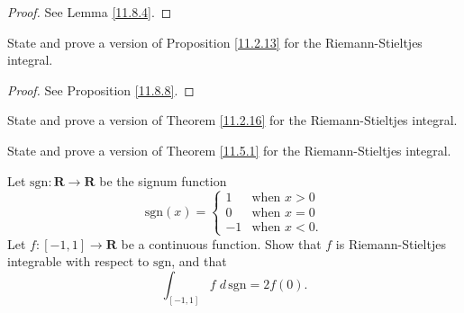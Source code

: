 \begin{proof}
    See Lemma \ref{11.8.4}.
\end{proof}

\begin{exercise}\label{ex 11.8.2}
    State and prove a version of Proposition \ref{11.2.13} for the Riemann-Stieltjes integral.
\end{exercise}

\begin{proof}
    See Proposition \ref{11.8.8}.
\end{proof}

\begin{exercise}\label{ex 11.8.3}
    State and prove a version of Theorem \ref{11.2.16} for the Riemann-Stieltjes integral.
\end{exercise}

\begin{exercise}\label{ex 11.8.4}
    State and prove a version of Theorem \ref{11.5.1} for the Riemann-Stieltjes integral.
\end{exercise}

\begin{exercise}\label{ex 11.8.5}
    Let \(\text{sgn} : \mathbf{R} \to \mathbf{R}\) be the signum function
    \[
        \text{sgn}(x) = \begin{cases}
            1  & \text{when } x > 0  \\
            0  & \text{when } x = 0  \\
            -1 & \text{when } x < 0.
        \end{cases}
    \]
    Let \(f : [-1, 1] \to \mathbf{R}\) be a continuous function.
    Show that \(f\) is Riemann-Stieltjes integrable with respect to \(\text{sgn}\), and that
    \[
        \int_{[-1, 1]} f \; d \, \text{sgn} = 2f(0).
    \]
\end{exercise}